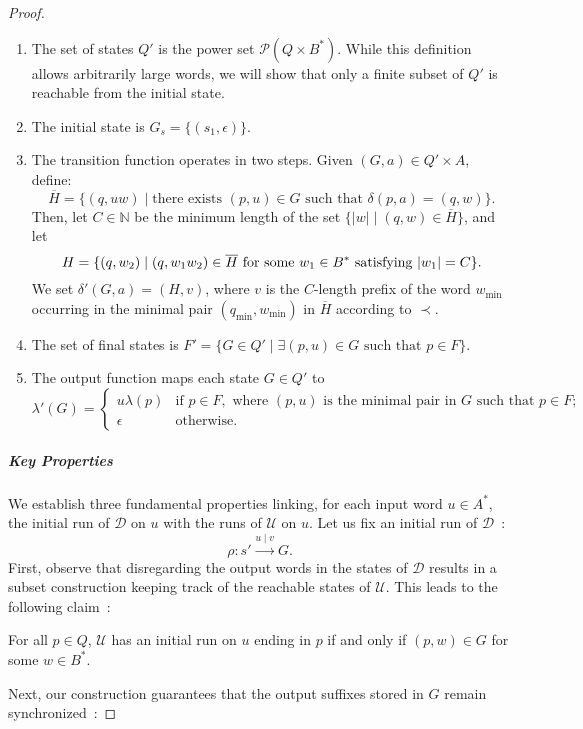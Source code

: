\documentclass[a4paper,UKenglish,cleveref, autoref, thm-restate,authorcolumns, colorlinks]{lipics-v2021}
\newcommand\calD{\mathcal{D}}
\newcommand\calU{\mathcal{U}}
\begin{document}
{\begin{proof}
    \begin{enumerate}
        \item The set of states $Q'$ is the power set $\mathcal{P}(Q \times B^*)$.
        While this definition allows arbitrarily large words,
        we will show that only a finite subset of $Q'$ is reachable from the initial state.
        \item The initial state is $G_s = \{(s_1,\epsilon)\}$.
        \item The transition function operates in two steps. Given $(G,a) \in Q' \times A$, define:
        \[
            \overline{H} = \{(q,uw) \mid \text{there exists $(p,u) \in G$ such that } \delta(p,a) = (q,w)\}.
        \]
        Then, let $C \in \mathbb{N}$ be the minimum length of the set
        $\{|w| \mid (q,w) \in \overline{H}\}$, and let
        \[
            H = \{(q,w_2) \mid (q,w_1w_2) \in \overline{H} \text{ for some } w_1 \in B^* \textup{ satisfying } |w_1| = C\}.
        \]
        We set $\delta'(G,a) = (H,v)$, where $v$ is the $C$-length prefix of the word $w_{\min}$
        occurring in the minimal pair $(q_{\min},w_{\min})$ in $\overline{H}$ according to $\prec$.
        \item The set of final states is 
        $F' = \{G \in Q' \mid \exists (p,u) \in G \text{ such that } p \in F \}.$
        \item The output function maps each state $G \in Q'$ to
        \[
            \lambda'(G) =
            \begin{cases}
                u \lambda(p) & \text{if } p \in F, \text{ where } (p,u) 
                \text{ is the minimal pair in } G \text{ such that } p \in F; \\
                \epsilon & \text{otherwise}.
            \end{cases}
        \]
    \end{enumerate}

   \subparagraph*{Key Properties}
    We establish three fundamental properties linking, for each input word $u \in A^*$,
    the initial run of $\calD$ on $u$ with the runs of $\calU$ on $u$.
    Let us fix an initial run of $\calD$~:
    \[
        \rho : s' \xrightarrow{u \mid v} G.
    \]
    First, observe that disregarding the output words in the states of $\calD$
    results in a subset construction keeping track of the
    reachable states of $\calU$.
    This leads to the following claim~:
    
    \begin{claim}\label{claim:states2}
        For all $p \in Q$,
        $\calU$ has an initial run on $u$ ending in $p$
        if and only if $(p,w) \in G$ for some $w \in B^*$.
    \end{claim}
    Next, our construction guarantees that the output suffixes stored in $G$
    remain synchronized~:
    

\end{proof}}
\end{document}
